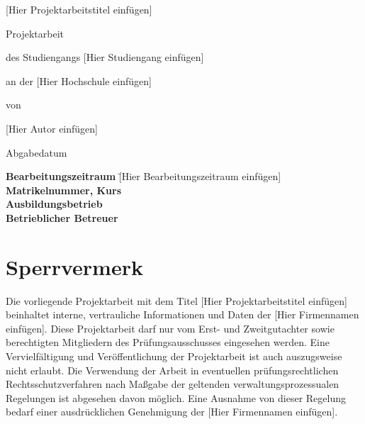 \documentclass[a4paper, 12pt]{article}
\begin{document}
\begin{titlepage}
    \vspace*{0.5cm}
    \centering
    
    {\Huge [Hier Projektarbeitstitel einfügen]\par}
    \vspace{1.5cm}
    {\huge Projektarbeit\par}
    \vspace{1.25cm}
    {\Large des Studiengangs [Hier Studiengang einfügen]\par}
    {\Large an der [Hier Hochschule einfügen]\par}
    \vspace{1cm}
    {\Large von \par}
    {\Large [Hier Autor einfügen] \par}
    \vspace{1cm}
    {\Large Abgabedatum  \par}
    \vspace{3cm}
    {\large
        \begin{tabbing}
            \textbf{Bearbeitungszeitraum} \qquad \qquad \qquad \= [Hier Bearbeitungszeitraum einfügen]\\
            \textbf{Matrikelnummer, Kurs}  \\
            \textbf{Ausbildungsbetrieb}  \\
            \textbf{Betrieblicher Betreuer} 
        \end{tabbing}
    \par}
    \vspace{1cm}
    \vfill
\end{titlepage}

\pagebreak
%
\pagebreak
\section*{Sperrvermerk}
Die vorliegende Projektarbeit mit dem Titel [Hier Projektarbeitstitel einfügen] beinhaltet interne, vertrauliche Informationen und Daten der [Hier Firmennamen einfügen].
Diese Projektarbeit darf nur vom Erst- und Zweitgutachter sowie berechtigten Mitgliedern des Prüfungsausschusses eingesehen werden. 
Eine Vervielfältigung und Veröffentlichung der Projektarbeit ist auch auszugsweise nicht erlaubt. 
Die Verwendung der Arbeit in eventuellen prüfungsrechtlichen Rechtsschutzverfahren nach Maßgabe der geltenden verwaltungsprozessualen Regelungen ist abgesehen davon möglich.
Eine Ausnahme von dieser Regelung bedarf einer ausdrücklichen Genehmigung der [Hier Firmennamen einfügen].
\end{document}
